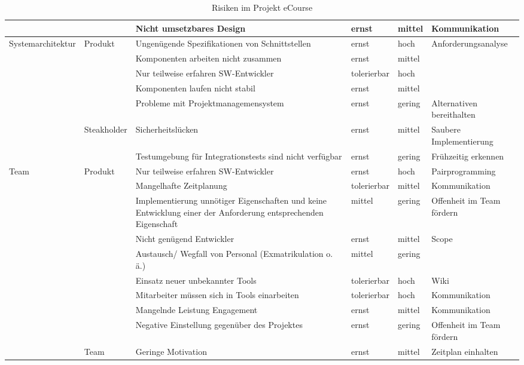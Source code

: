 \begin{table}
\begin{tabularx}{\textwidth}{|l|l|X|l|l|X|}
\hline
 &  & Nicht umsetzbares Design & ernst & mittel & Kommunikation  \\ 
\hline
Systemarchitektur & Produkt & Ungenügende Spezifikationen von Schnittstellen & ernst & hoch & Anforderungsanalyse \\ 
\hline
 &  & Komponenten arbeiten nicht zusammen & ernst & mittel &  \\ 
\hline
 &  & Nur teilweise erfahren SW-Entwickler & tolerierbar & hoch &  \\ 
\hline
 &  & Komponenten laufen nicht stabil & ernst & mittel &  \\ 
\hline
 &  & Probleme mit Projektmanagemensystem & ernst & gering & Alternativen bereithalten \\ 
\hline
 & Steakholder & Sicherheitslücken & ernst & mittel & Saubere Implementierung \\ 
\hline
 &  & Testumgebung für Integrationstests sind nicht verfügbar & ernst & gering & Frühzeitig erkennen \\ 
\hline
Team & Produkt & Nur teilweise erfahren SW-Entwickler & ernst & hoch & Pairprogramming \\ 
\hline
 &  & Mangelhafte Zeitplanung & tolerierbar & mittel & Kommunikation  \\ 
\hline
 &  & Implementierung unnötiger Eigenschaften und keine Entwicklung einer der Anforderung entsprechenden Eigenschaft & mittel & gering & Offenheit im Team fördern \\ 
\hline
 &  & Nicht genügend Entwickler & ernst & mittel & Scope  \\ 
\hline
 &  & Austausch/ Wegfall von Personal (Exmatrikulation o. ä.) & mittel & gering &  \\ 
\hline
 &  & Einsatz neuer unbekannter Tools & tolerierbar & hoch & Wiki \\ 
\hline
 &  & Mitarbeiter müssen sich in Tools einarbeiten & tolerierbar & hoch & Kommunikation  \\ 
\hline
 &  & Mangelnde Leistung Engagement & ernst & mittel & Kommunikation \\ 
\hline
 &  & Negative Einstellung gegenüber des Projektes & ernst & gering & Offenheit im Team fördern \\ 
\hline
 & Team & Geringe Motivation & ernst & mittel & Zeitplan einhalten \\ 
\hline
\end{tabularx}
\caption{Risiken im Projekt eCourse}
\label{tab:Risiken}
\end{table}
